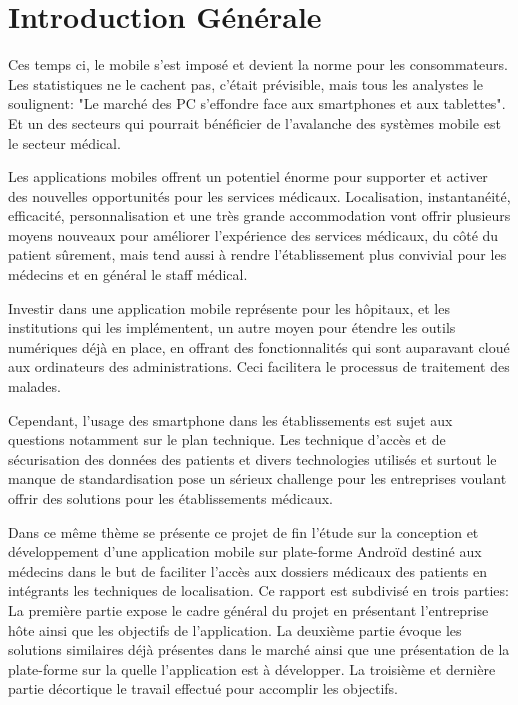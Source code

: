 
\chapter{Introduction Générale}

Ces temps ci, le mobile s’est imposé et devient la norme pour les
consommateurs. Les statistiques ne le cachent pas, c’était prévisible,
mais tous les analystes le soulignent: "Le marché des PC s’effondre face
aux smartphones et aux tablettes"\cite{lefigaro}. Et un des secteurs qui
pourrait bénéficier de l'avalanche des systèmes mobile est le secteur
médical.

Les applications mobiles offrent un potentiel énorme pour supporter et
activer des nouvelles opportunités pour les services médicaux.
Localisation, instantanéité, efficacité, personnalisation et une très
grande accommodation vont offrir plusieurs moyens nouveaux pour
améliorer l’expérience des services médicaux, du côté du patient
sûrement, mais tend aussi à rendre l’établissement plus convivial pour
les médecins et en général le staff médical.

Investir dans une application mobile représente pour les hôpitaux, et
les institutions qui les implémentent, un autre moyen pour étendre les
outils numériques déjà en place, en offrant des fonctionnalités qui sont
auparavant cloué aux ordinateurs des administrations. Ceci  facilitera
le processus de traitement des malades.

Cependant, l’usage des smartphone dans les établissements est sujet aux
questions notamment sur le plan technique. Les technique d’accès et de
sécurisation des données des patients et divers technologies utilisés et
surtout le manque de standardisation pose un sérieux challenge pour les
entreprises voulant offrir des solutions pour les établissements
médicaux.

Dans ce même thème se présente ce projet de fin l’étude sur la
conception et développement d’une application mobile sur plate-forme
Androïd destiné aux médecins dans le but de faciliter l’accès aux
dossiers médicaux des patients en intégrants les techniques de
localisation. Ce rapport est subdivisé en trois parties: La première
partie expose le cadre général du projet en présentant l’entreprise hôte
ainsi que les objectifs de l’application. La deuxième partie évoque les
solutions similaires déjà présentes dans le marché ainsi que une
présentation de la plate-forme sur la quelle l’application est à
développer. La troisième et dernière partie décortique le travail
effectué pour accomplir les objectifs.
